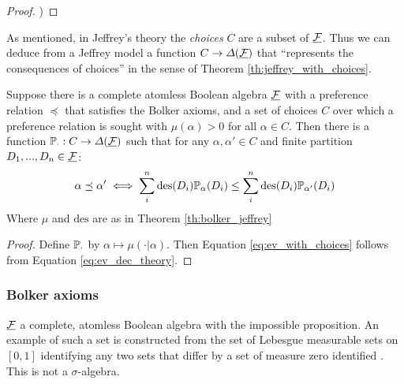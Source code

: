 \begin{proof}
\citet{bolker_functions_1966})
\end{proof}

As mentioned, in Jeffrey's theory the \emph{choices} $C$ are a subset of $\underline{\mathcal{F}}$. Thus we can deduce from a Jeffrey model a function $C\to \Delta(\underline{\mathcal{F}})$ that ``represents the consequences of choices'' in the sense of Theorem \ref{th:jeffrey_with_choices}.

\begin{theorem}\label{th:jeffrey_with_choices}
Suppose there is a complete atomless Boolean algebra $\underline{\mathcal{F}}$ with a preference relation $\preceq$ that satisfies the Bolker axioms, and a set of choices $C$ over which a preference relation is sought with $\mu(\alpha)>0$ for all $\alpha\in C$. Then there is a function $\mathbb{P}_\cdot:C\to \Delta(\underline{\mathcal{F}})$ such that for any $\alpha,\alpha'\in C$ and finite partition $D_1,...,D_n\in \underline{\mathcal{F}}$:
\begin{align}
    \alpha \preceq \alpha'\iff \sum_{i}^n \text{des}(D_i) \mathbb{P}_\alpha(D_i) \leq \sum_{i}^n \text{des}(D_i) \mathbb{P}_{\alpha'}(D_i)\label{eq:ev_with_choices}
\end{align}
Where $\mu$ and $\mathrm{des}$ are as in Theorem \ref{th:bolker_jeffrey}
\end{theorem}

\begin{proof}
Define $\mathbb{P}_\cdot$ by $\alpha\mapsto \mu(\cdot|\alpha)$. Then Equation \ref{eq:ev_with_choices} follows from Equation \ref{eq:ev_dec_theory}.
\end{proof}

\subsubsection{Bolker axioms}\label{sec:bolker_axioms}

$\underline{\mathcal{F}}$ a complete, atomless Boolean algebra with the impossible proposition. An example of such a set is constructed from the set of Lebesgue measurable sets on $[0,1]$ identifying any two sets that differ by a set of measure zero identified \citet{bolker_simultaneous_1967}. This is not a $\sigma$-algebra.
 

